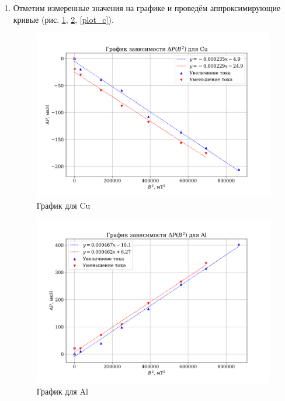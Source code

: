 \documentclass[a4paper,12pt]{article}
\begin{document}
\begin{enumerate}
\item Отметим измеренные значения на графике и проведём аппроксимирующие кривые (рис. \ref{plot_cu}, \ref{plot_al}, \ref{plot_c}).

\begin{figure}[h!]
\begin{center}
\includegraphics[width=0.85\linewidth]{plot_cu.png}
\caption{График для Cu}
\label{plot_cu}
\end{center}
\end{figure}

\begin{figure}[h!]
\begin{center}
\includegraphics[width=0.8\linewidth]{plot_al.png}
\caption{График для Al}
\label{plot_al}
\end{center}
\end{figure}


\end{enumerate}
\end{document}
